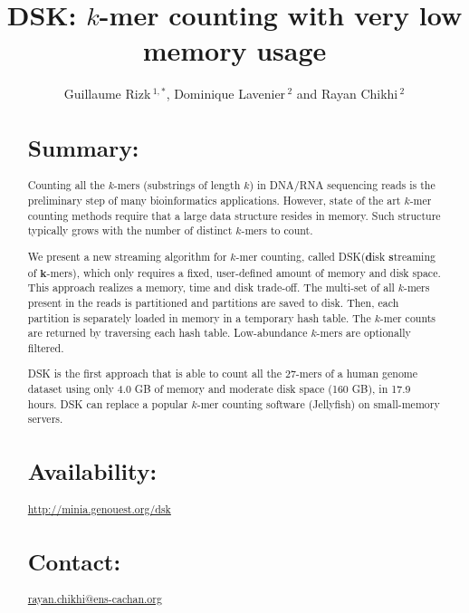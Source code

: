 \documentclass{bioinfo}
\newcommand{\dsk}{DSK\xspace}
\begin{document}

\title[short title]{\dsk: $k$-mer counting with very low memory usage}
\author[G. Rizk \textit{et~al}]{Guillaume Rizk\,$^{1,*}$, Dominique Lavenier\,$^{2}$ and Rayan Chikhi\,$^2$%
}
\address{$^{1}$Algorizk, 75013 Paris, France\\
$^{2}$ENS Cachan Brittany / IRISA, Campus de Beaulieu, 35700 Rennes, France}



\maketitle

\begin{abstract}

\section{Summary:}
Counting all the $k$-mers (substrings of length $k$) in DNA/RNA sequencing reads is the preliminary step of many bioinformatics applications. However, state of the art $k$-mer counting methods require that a large data structure resides in memory. Such structure typically grows with the number of distinct $k$-mers to count. 

We present a new streaming algorithm for $k$-mer counting, called \dsk (\textbf{d}isk \textbf{s}treaming of $\mathbf{k}$-mers), which only requires a fixed, user-defined amount of memory and disk space.
This approach realizes a memory, time and disk trade-off. The multi-set of all $k$-mers present in the reads is partitioned and partitions are saved to disk. Then, each partition is separately loaded in memory in a temporary hash table. The $k$-mer counts are returned by traversing each hash table. Low-abundance $k$-mers are optionally filtered.

\dsk is the first approach that is able to count all the $27$-mers of a human genome dataset using only 4.0 GB of memory and moderate disk space (160 GB), in 17.9 hours. \dsk can replace a popular $k$-mer counting software (Jellyfish) on small-memory servers.
\section{Availability:}
 \href{http://minia.genouest.org}{http://minia.genouest.org/dsk}

\section{Contact:} \href{guillaume.rizk@gmail.com}{rayan.chikhi@ens-cachan.org}
\end{abstract}
\end{document}
